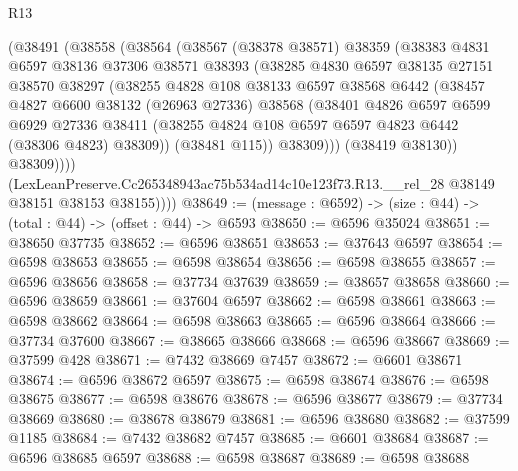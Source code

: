 \begin{lexlean}{R13}
\begin{coremodule}
            (@38491
              (@38558
                (@38564
                  (@38567
                    (@38378 @38571)
                    @38359
                    (@38383
                      @4831
                      @6597
                      @38136
                      @37306
                      @38571
                      @38393
                      (@38285
                        @4830
                        @6597
                        @38135
                        @27151
                        @38570
                        @38297
                        (@38255
                          @4828
                          @108
                          @38133
                          @6597
                          @38568
                          @6442
                          (@38457
                            @4827
                            @6600
                            @38132
                            (@26963 @27336)
                            @38568
                            (@38401
                              @4826
                              @6597
                              @6599
                              @6929
                              @27336
                              @38411
                              (@38255 @4824 @108 @6597 @6597 @4823 @6442 (@38306 @4823) @38309))
                            (@38481 @115))
                          @38309)))
                    (@38419 @38130))
                  @38309))))
          (LexLeanPreserve.Cc265348943ac75b534ad14c10e123f73.R13.__rel_28
            @38149
            @38151
            @38153
            @38155))))
@38649 := (message : @6592) -> (size : @44) -> (total : @44) -> (offset : @44) -> @6593
@38650 := @6596 @35024
@38651 := @38650 @37735
@38652 := @6596 @38651
@38653 := @37643 @6597
@38654 := @6598 @38653
@38655 := @6598 @38654
@38656 := @6598 @38655
@38657 := @6596 @38656
@38658 := @37734 @37639
@38659 := @38657 @38658
@38660 := @6596 @38659
@38661 := @37604 @6597
@38662 := @6598 @38661
@38663 := @6598 @38662
@38664 := @6598 @38663
@38665 := @6596 @38664
@38666 := @37734 @37600
@38667 := @38665 @38666
@38668 := @6596 @38667
@38669 := @37599 @428
@38671 := @7432 @38669 @7457
@38672 := @6601 @38671
@38674 := @6596 @38672 @6597
@38675 := @6598 @38674
@38676 := @6598 @38675
@38677 := @6598 @38676
@38678 := @6596 @38677
@38679 := @37734 @38669
@38680 := @38678 @38679
@38681 := @6596 @38680
@38682 := @37599 @1185
@38684 := @7432 @38682 @7457
@38685 := @6601 @38684
@38687 := @6596 @38685 @6597
@38688 := @6598 @38687
@38689 := @6598 @38688

\end{coremodule}
\end{lexlean}
